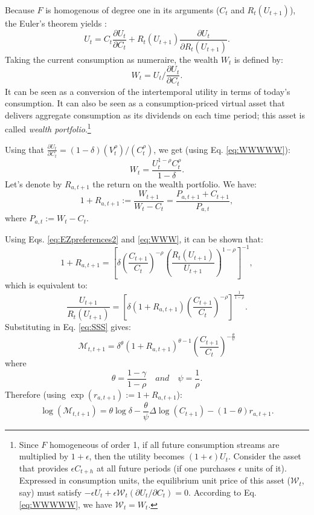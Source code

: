 \documentclass[
  12pt,
]{book}
\theoremstyle{definition}
\theoremstyle{definition}
\theoremstyle{definition}
\theoremstyle{definition}
\theoremstyle{remark}
\begin{document}
Because \(F\) is homogenous of degree one in its arguments (\(C_t\) and \(R_t(U_{t+1})\)), the Euler's theorem yields \citep{HANSEN20073967}:
\begin{equation}
U_t = C_t \frac{\partial U_t}{\partial C_t} +  R_t(U_{t+1}) \frac{\partial U_t}{\partial R_t(U_{t+1})}.\label{eq:XXYXX}
\end{equation}
Taking the current consumption as numeraire, the wealth \(W_t\) is defined by:
\begin{equation}
W_t =   U_t \big/ \frac{\partial U_t}{\partial C_t}.\label{eq:WWWWW}
\end{equation}
It can be seen as a conversion of the intertemporal utility in terms of today's consumption. It can also be seen as a consumption-priced virtual asset that delivers aggregate consumption as its dividends on each time period; this asset is called \emph{wealth portfolio}.\footnote{Since \(F\) homogeneous of order 1, if all future consumption streams are multiplied by \(1+\epsilon\), then the utility becomes \((1+\epsilon)U_t\). Consider the asset that provides \(\epsilon C_{t+h}\) at all future periods (if one purchases \(\epsilon\) units of it). Expressed in consumption units, the equilibrium unit price of this asset (\(\mathcal{W}_t\), say) must satisfy \(-\epsilon U_t + \epsilon \mathcal{W}_t (\partial U_t / \partial C_t)=0\). According to Eq. \eqref{eq:WWWWW}, we have \(\mathcal{W}_t = W_t\).}

Using that \(\frac{\partial U_t}{\partial C_t}=(1 - \delta)(V_t^\rho)/(C_t^{\rho})\), we get (using Eq. \eqref{eq:WWWWW}):
\begin{equation}
W_t = \frac{U_t^{1-\rho}C_t^\rho}{1 - \delta}.\label{eq:WWW}
\end{equation}
Let's denote by \(R_{a,t+1}\) the return on the wealth portfolio. We have:
\begin{equation}
1+R_{a,t+1} := \frac{W_{t+1}}{W_t - C_t} = \frac{P_{a,t+1}+C_{t+1}}{P_{a,t}},\label{eq:Ra}
\end{equation}
where \(P_{a,t} := W_t - C_t\).

Using Eqs. \eqref{eq:EZpreferences2} and \eqref{eq:WWW}, it can be shown that:
\[
1+R_{a,t+1} = \left[ \delta \left( \frac{C_{t+1}}{C_t} \right)^{-\rho} \left( \frac{R_t(U_{t+1})}{U_{t+1}} \right)^{1-\rho} \right]^{-1},
\]
which is equivalent to:
\[
\frac{U_{t+1}}{R_t(U_{t+1})} = \left[ \delta (1+ R_{a,t+1}) \left( \frac{C_{t+1}}{C_t} \right)^{-\rho}  \right]^{\frac{1}{1-\rho}}.
\]
Substituting in Eq. \eqref{eq:SSS} gives:
\begin{equation}
\mathcal{M}_{t,t+1} =  \delta^{\theta} (1+R_{a,t+1})^{\theta - 1} \left( \frac{C_{t+1}}{C_t} \right)^{- \frac{\theta}{\psi}}
\end{equation}
where
\[
\theta = \frac{1-\gamma}{1-\rho} \quad and \quad \psi = \frac{1}{\rho}.
\]
Therefore (using \(\exp(r_{a,t+1}):=1+R_{a,t+1}\)):
\begin{equation}
\boxed{\log(\mathcal{M}_{t,t+1}) = \theta \log \delta - \frac{\theta}{\psi} \Delta \log(C_{t+1}) - (1-\theta) r_{a,t+1}.}\label{eq:sdfEZ}
\end{equation}
\end{document}
